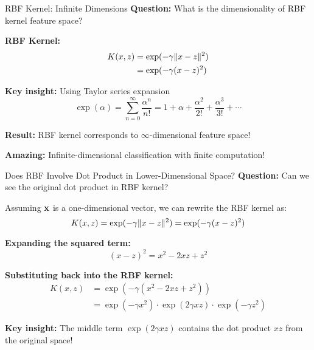 \documentclass{beamer}
\begin{document}
	\begin{frame}{RBF Kernel: Infinite Dimensions}
	    \textbf{Question:} What is the dimensionality of RBF kernel feature space?
	    
	    \textbf{RBF Kernel:}
	    \begin{align*}
	        K(x, z) &= \exp(-\gamma\|x - z\|^{2})\\
	        &= \exp(-\gamma(x - z)^{2})
	    \end{align*}
	    
	    \textbf{Key insight:} Using Taylor series expansion
	    $$\exp(\alpha) = \sum_{n=0}^{\infty}\frac{\alpha^{n}}{n!} = 1 + \alpha + \frac{\alpha^2}{2!} + \frac{\alpha^3}{3!} + \cdots$$
	    
	    \textbf{Result:} RBF kernel corresponds to $\infty$-dimensional feature space!
	    
	    \textbf{Amazing:} Infinite-dimensional classification with finite computation!
	\end{frame}
	
	\begin{frame}{Does RBF Involve Dot Product in Lower-Dimensional Space?}
	\textbf{Question:} Can we see the original dot product in RBF kernel?
	
	Assuming $\mathbf{x}$ is a one-dimensional vector, we can rewrite the RBF kernel as:
	$$K(x, z) = \exp(-\gamma\|x-z\|^{2}) = \exp(-\gamma(x-z)^{2})$$
	
	\pause
	\textbf{Expanding the squared term:}
	$$(x - z)^{2} = x^{2} - 2xz + z^{2}$$
	
	\pause
	\textbf{Substituting back into the RBF kernel:}
	\begin{align*}
	K(x, z) &= \exp(-\gamma(x^{2}-2xz+z^{2})) \\
	&= \exp(-\gamma x^{2}) \cdot \exp(2\gamma xz) \cdot \exp(-\gamma z^{2})
	\end{align*}
	
	\textbf{Key insight:} The middle term $\exp(2\gamma xz)$ contains the dot product $xz$ from the original space!
	\end{frame}
	
\end{document}
